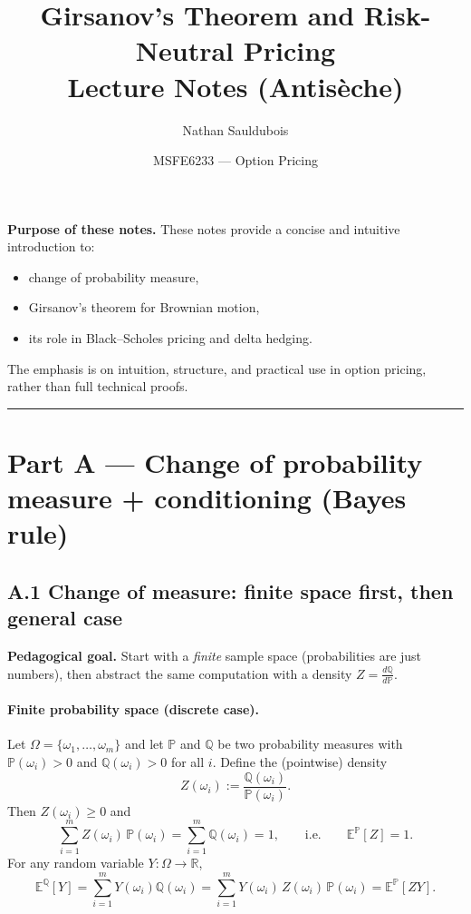 \documentclass[11pt]{article}
\title{\textbf{Girsanov's Theorem and Risk-Neutral Pricing}\\
\large Lecture Notes (Antisèche)}
\author{Nathan Sauldubois}
\date{MSFE6233 --- Option Pricing}
\newcommand{\Pbb}{\mathbb{P}}
\newcommand{\Qbb}{\mathbb{Q}}
\newcommand{\E}{\mathbb{E}}
\newcommand{\R}{\mathbb{R}}
\newcommand{\1}{\mathbf{1}}
\begin{document}
\maketitle
\vspace{-1.2em}

\noindent\textbf{Purpose of these notes.}
These notes provide a concise and intuitive introduction to:
\begin{itemize}[leftmargin=1.4em, itemsep=0.2em]
  \item change of probability measure,
  \item Girsanov’s theorem for Brownian motion,
  \item its role in Black--Scholes pricing and delta hedging.
\end{itemize}

The emphasis is on intuition, structure, and practical use in option pricing,
rather than full technical proofs.

\vspace{0.5em}
\hrule
\vspace{1em}

\section*{Part A --- Change of probability measure + conditioning (Bayes rule)}

\subsection*{A.1 Change of measure: finite space first, then general case}

\textbf{Pedagogical goal.} Start with a \emph{finite} sample space (probabilities are just numbers),
then abstract the same computation with a density $Z=\frac{d\Qbb}{d\Pbb}$.

\paragraph{Finite probability space (discrete case).}
Let $\Omega=\{\omega_1,\dots,\omega_m\}$ and let $\Pbb$ and $\Qbb$ be two probability measures
with $\Pbb(\omega_i)>0$ and $\Qbb(\omega_i)>0$ for all $i$.
Define the (pointwise) density
\[
Z(\omega_i):=\frac{\Qbb(\omega_i)}{\Pbb(\omega_i)}.
\]
Then $Z(\omega_i)\ge 0$ and
\[
\sum_{i=1}^m Z(\omega_i)\,\Pbb(\omega_i)
=
\sum_{i=1}^m \Qbb(\omega_i)
=
1,
\qquad\text{i.e.}\qquad
\E^{\Pbb}[Z]=1.
\]
For any random variable $Y:\Omega\to\R$,
\[
\E^{\Qbb}[Y]
=
\sum_{i=1}^m Y(\omega_i)\Qbb(\omega_i)
=
\sum_{i=1}^m Y(\omega_i)\,Z(\omega_i)\,\Pbb(\omega_i)
=
\E^{\Pbb}[ZY].
\]
\end{document}

